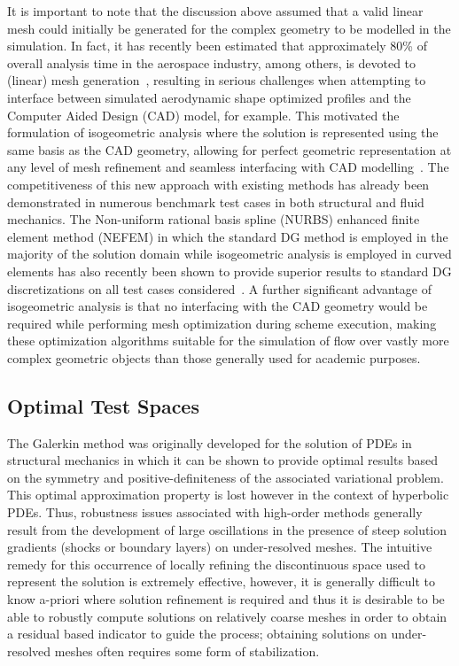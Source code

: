 \documentclass[12pt,Bold,letterpaper,TexShade]{mcgilletdclass}
\numberwithin{equation}{section}
\begin{document}
It is important to note that the discussion above assumed that a valid linear mesh could initially be generated for the complex geometry to be modelled in the simulation. In fact, it has recently been estimated that approximately 80\% of overall analysis time in the aerospace industry, among others, is devoted to (linear) mesh generation~\cite{hughes2005}, resulting in serious challenges when attempting to interface between simulated aerodynamic shape optimized profiles and the Computer Aided Design (CAD) model, for example. This motivated the formulation of isogeometric analysis where the solution is represented using the same basis as the CAD geometry, allowing for perfect geometric representation at any level of mesh refinement and seamless interfacing with CAD modelling~\cite{hughes2005}. The competitiveness of this new approach with existing methods has already been demonstrated in numerous benchmark test cases in both structural and fluid mechanics. The Non-uniform rational basis spline (NURBS) enhanced finite element method (NEFEM) in which the standard DG method is employed in the majority of the solution domain while isogeometric analysis is employed in curved elements has also recently been shown to provide superior results to standard DG discretizations on all test cases considered~\cite{sevilla2008,sevilla2011}. A further significant advantage of isogeometric analysis is that no interfacing with the CAD geometry would be required while performing mesh optimization during scheme execution, making these optimization algorithms suitable for the simulation of flow over vastly more complex geometric objects than those generally used for academic purposes.

\subsection{Optimal Test Spaces}

The Galerkin method was originally developed for the solution of PDEs in structural mechanics in which it can be shown to provide optimal results based on the symmetry and positive-definiteness of the associated variational problem. This optimal approximation property is lost however in the context of hyperbolic PDEs. Thus, robustness issues associated with high-order methods generally result from the development of large oscillations in the presence of steep solution gradients (shocks or boundary layers) on under-resolved meshes. The intuitive remedy for this occurrence of locally refining the discontinuous space used to represent the solution is extremely effective, however, it is generally difficult to know a-priori where solution refinement is required and thus it is desirable to be able to robustly compute solutions on relatively coarse meshes in order to obtain a residual based indicator to guide the process; obtaining solutions on under-resolved meshes often requires some form of stabilization.
\end{document}
